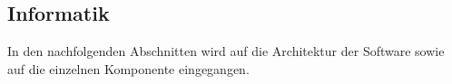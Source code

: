 \subsection{Informatik}
In den nachfolgenden Abschnitten wird auf die Architektur der Software sowie auf die einzelnen Komponente eingegangen.


\newpage

\newpage

\newpage

\newpage